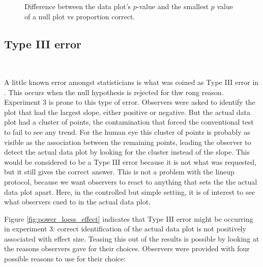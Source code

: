 \documentclass{article}
\begin{document}
\begin{figure}[hbtp]
   \centering
       \caption{Difference between the data plot's $p$-value and the  smallest $p$ value of a null plot vs proportion correct.}
       \label{fig:pval_difference}
\end{figure}

\subsection{Type III error}~\label{sec:TypeIII}


A little known error amongst statisticians is what was coined as Type III error in \citet{mosteller:48}. This occurs when the null hypothesis is rejected for thw rong reason. Experiment 3 is prone to this type of error. Observers were asked to identify the plot that had the largest slope, either positive or negative. But the actual data plot had a cluster of points, the contamination that forced the conventional test to fail to see any trend. For the human eye this cluster of points is probably as visible as the association between the remaining points, leading the observer to detect the actual data plot by looking for the cluster instead of the slope. This would be considered to be a Type III error because it is not what was requested, but it still gives the correct answer. This is not a problem with the lineup protocol, because we want observers to react to anything that sets the the actual data plot apart. Here, in the controlled but simple setting, it is of interest to see what observers cued to in the actual data plot. 

Figure \ref{fig:power_loess_effect} indicates that Type III error might be occurring in experiment 3: correct identification of the actual data plot is not positively associated with effect size. Teasing this out of the results is possible by looking at the reasons observers gave for their choices. Observers were provided with four possible reasons to use for their choice:
\end{document}
